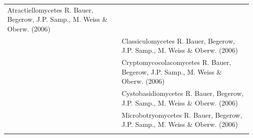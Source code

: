 \documentclass[]{book}
\begin{document}
\begin{longtable}[]{@{}lll@{}}
\begin{minipage}[t]{0.31\columnwidth}
Atractiellomycetes R. Bauer, Begerow, J.P. Samp., M. Weiss \& Oberw. (2006)\strut
\end{minipage}\tabularnewline
\begin{minipage}[t]{0.32\columnwidth}\raggedright
\strut
\end{minipage} & \begin{minipage}[t]{0.28\columnwidth}\raggedright
\strut
\end{minipage} & \begin{minipage}[t]{0.31\columnwidth}\raggedright
Classiculomycetes R. Bauer, Begerow, J.P. Samp., M. Weiss \& Oberw. (2006)\strut
\end{minipage}\tabularnewline
\begin{minipage}[t]{0.32\columnwidth}\raggedright
\strut
\end{minipage} & \begin{minipage}[t]{0.28\columnwidth}\raggedright
\strut
\end{minipage} & \begin{minipage}[t]{0.31\columnwidth}\raggedright
Cryptomycocolacomycetes R. Bauer, Begerow, J.P. Samp., M. Weiss \& Oberw. (2006)\strut
\end{minipage}\tabularnewline
\begin{minipage}[t]{0.32\columnwidth}\raggedright
\strut
\end{minipage} & \begin{minipage}[t]{0.28\columnwidth}\raggedright
\strut
\end{minipage} & \begin{minipage}[t]{0.31\columnwidth}\raggedright
Cystobasidiomycetes R. Bauer, Begerow, J.P. Samp., M. Weiss \& Oberw. (2006)\strut
\end{minipage}\tabularnewline
\begin{minipage}[t]{0.32\columnwidth}\raggedright
\strut
\end{minipage} & \begin{minipage}[t]{0.28\columnwidth}\raggedright
\strut
\end{minipage} & \begin{minipage}[t]{0.31\columnwidth}\raggedright
Microbotryomycetes R. Bauer, Begerow, J.P. Samp., M. Weiss \& Oberw. (2006)\strut
\end{minipage}\tabularnewline
\begin{minipage}[t]{0.32\columnwidth}\raggedright
\strut
\end{minipage} & \begin{minipage}[t]{0.28\columnwidth}\raggedright

\end{minipage}
\end{longtable}
\end{document}
